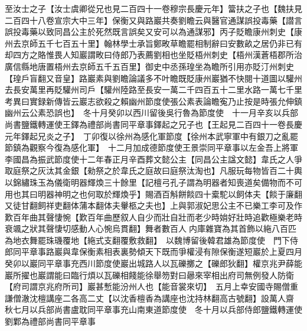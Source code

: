 至汝士之子【汝士虞卿從兄也見二百四十一卷穆宗長慶元年】簹扶之子也【魏扶見二百四十八卷宣宗大中三年】保衡又與路巖共奏劉瞻云與醫官通謀誤投毒藥【譛言誤投毒藥以致同昌公主於死然既言誤矣又安可以為通謀邪】丙子貶瞻康州刺史【康州去京師五千七百五十里】翰林學士承旨鄭畋草瞻罷相制辭曰安數畝之居仍非已有却四方之賂惟畏人知巖謂畋曰侍郎乃表薦劉相也坐貶梧州刺史【梧州漢蒼梧郡所治廣信縣地唐置梧州去京師五千五百里】御史中丞孫瑝坐為瞻所引用亦貶汀州刺史【瑝戶盲翻又音皇】路巖素與劉瞻論議多不叶瞻既貶康州巖猶不快閱十道圖以驩州去長安萬里再貶驩州司戶【驩州陸路至長安一萬二千四百五十二里水路一萬七千里　考異曰實録新傳皆云巖志欲殺之賴幽州節度使張公素表論瞻寃乃止按是時張允伸鎮幽州云公素恐誤也】　冬十月癸卯以西川留後吳行魯為節度使　十一月辛亥以兵部尚書鹽鐵轉運使王鐸為禮部尚書同平章事鐸起之兄子也【王起見二百四十一卷長慶元年鐸起兄炎之子】　丁卯復以徐州為感化軍節度【徐州本武寧軍中有銀刀之亂罷節鎮為觀察今復為感化軍】　十二月加成德節度使王景崇同平章事以左金吾上將軍李國昌為振武節度使十二年春正月辛酉葬文懿公主【同昌公主諡文懿】韋氏之人爭取庭祭之灰汰其金銀【勑祭之於韋氏之庭故曰庭祭汰淘也】凡服玩每物皆百二十輿以錦繡珠玉為儀衛明器輝煥三十餘里【記檀弓孔子謂為明器者知喪道矣備物而不可用也其曰明器神明之也何取於輝煥乎】賜酒百斛餅餤四十槖駝以飼体夫【餤于廉翻又徒甘翻飼祥吏翻体蒲本翻体夫轝柩之夫也】上與郭淑妃思公主不已樂工李可及作歎百年曲其聲悽惋【歎百年曲歷叙人自少而壯自壯而老少時姢好壯時追歡極樂老時衰颯之狀其聲悽切感動人心惋烏貫翻】舞者數百人内庫雜寶為其首飾以絁八百匹為地衣舞罷珠璣覆地【絁式支翻覆敷救翻】　以魏博留後韓君雄為節度使　門下侍郎同平章事路巖與韋保衡素相表裏勢傾天下既而爭權浸有隙保衡遂短巖於上夏四月癸卯以巖同平章事充西川節度使巖出城路人以瓦礫擲之【礫郎狄翻】權京兆尹薛能巖所擢也巖謂能曰臨行煩以瓦礫相餞能徐舉笏對曰曏來宰相出府司無例發人防衛【府司謂京兆府所司】巖甚慙能汾州人也【能音裳來切】　五月上幸安國寺賜僧重謙僧澈沈檀講座二各高二丈【以沈香檀香為講座也沈持林翻高古號翻】設萬人齋　秋七月以兵部尚書盧耽同平章事充山南東道節度使　冬十月以兵部侍郎鹽鐵轉運使劉鄴為禮部尚書同平章事

